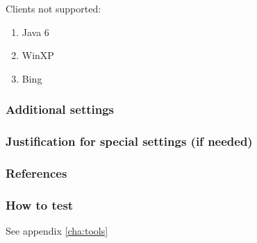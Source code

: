 Clients not supported:
\begin{enumerate}
  \item Java 6
  \item WinXP
  \item Bing
\end{enumerate}


\subsubsection{Additional settings}


\subsubsection{Justification for special settings (if needed)}


\subsubsection{References}


\subsubsection{How to test}
See appendix \ref{cha:tools}


